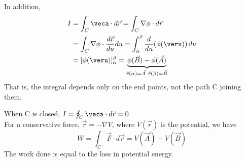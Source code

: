 \documentclass[a4paper, 11pt, normalem]{report}
\begin{document}
In addition,
\begin{align*}
    I &= \int_C \veca \cdot d\vec{r} = \int_C \nabla \phi \cdot d\vec{r} \\
    &= \int_C \nabla \phi \cdot \frac{d\vec{r}}{du}du = \int_\alpha^\beta \frac{d}{du}(\phi(\veru))\,du \\
    &= [\phi(\veru)]_{\alpha}^{\beta} = \underbrace{\phi(\vec{B}) - \phi(\vec{A})}_{\vec{r}(\alpha) = \vec{A}~ \vec{r}(\beta) = \vec{B}}
\end{align*}
That is, the integral depends only on the end points, not the path C joining them.

When C is closed, $I = \oint_C \veca \cdot d\vec{r} = 0$ \\
For a conservative force, $\vec{r} = -\nabla V$, where $V(\vec{r})$ is the potential, we have
\begin{equation*}
    W = \int_C \vec{F}\cdot d\vec{r} = V(\vec{A}) - V(\vec{B})
\end{equation*}
The work done is equal to the loss in potential energy.
\end{document}
